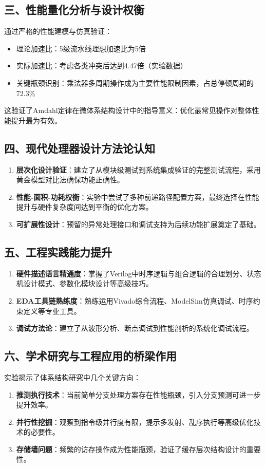 \documentclass[12pt,a4paper]{article}
\begin{document}
\subsection*{三、性能量化分析与设计权衡}
通过严格的性能建模与仿真验证：
\begin{itemize}
    \item 理论加速比：5级流水线理想加速比为5倍
    \item 实际加速比：考虑各类冲突后达到4.47倍（实验数据）
    \item 关键瓶颈识别：乘法器多周期操作成为主要性能限制因素，占总停顿周期的72.3\%
\end{itemize}
这验证了Amdahl定律在微体系结构设计中的指导意义：优化最常见操作对整体性能提升最为有效。

\subsection*{四、现代处理器设计方法论认知}
\begin{enumerate}
    \item \textbf{层次化设计验证}：建立了从模块级测试到系统集成验证的完整测试流程，采用黄金模型对比法确保功能正确性。
    \item \textbf{性能-面积-功耗权衡}：实验中尝试了多种前递路径配置方案，最终选择在性能提升与硬件复杂度间达到平衡的优化方案。
    \item \textbf{可扩展性设计}：预留的异常处理接口和调试支持为后续功能扩展奠定了基础。
\end{enumerate}

\subsection*{五、工程实践能力提升}
\begin{enumerate}
    \item \textbf{硬件描述语言精通度}：掌握了Verilog中时序逻辑与组合逻辑的合理划分、状态机设计模式、参数化模块设计等高级技巧。
    \item \textbf{EDA工具链熟练度}：熟练运用Vivado综合流程、ModelSim仿真调试、时序约束定义等专业工具。
    \item \textbf{调试方法论}：建立了从波形分析、断点调试到性能剖析的系统化调试流程。
\end{enumerate}

\subsection*{六、学术研究与工程应用的桥梁作用}
实验揭示了体系结构研究中几个关键方向：
\begin{enumerate}
    \item \textbf{推测执行技术}：当前简单分支处理方案存在性能瓶颈，引入分支预测可进一步提升效率。
    \item \textbf{并行性挖掘}：观察到指令级并行度有限，提示多发射、乱序执行等高级优化技术的必要性。
    \item \textbf{存储墙问题}：频繁的访存操作成为性能瓶颈，验证了缓存层次结构设计的重要性。
\end{enumerate}
\end{document}
